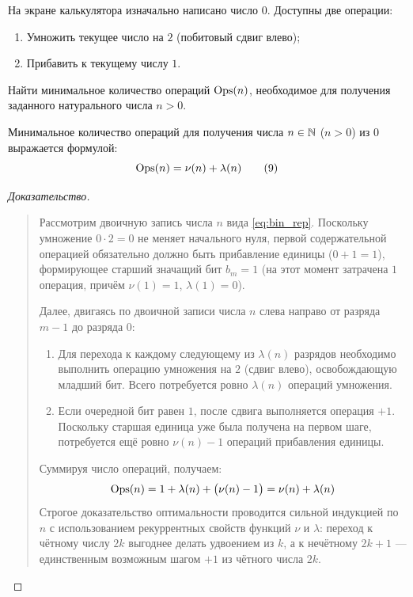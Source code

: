 \begin{problem}
    На экране калькулятора изначально написано число $0$. Доступны две 
    операции:
    \begin{enumerate}
        \item Умножить текущее число на $2$ (побитовый сдвиг влево);
        \item Прибавить к текущему числу $1$.
    \end{enumerate}
    Найти минимальное количество операций $\operatorname{Ops}(n)$, необходимое для 
    получения заданного натурального числа $n > 0$.
\end{problem}

\begin{proposition}
    Минимальное количество операций для получения числа $n \in \mathbb{N}$ ($n > 0$) 
    из $0$ выражается формулой:
    \begin{equation} \label{eq:ops_count}
        \operatorname{Ops}(n) = \nu(n) + \lambda(n) \tag{9}
    \end{equation}
\end{proposition}

\begin{proof}[Доказательство]~\\
    \begin{quote}
        Рассмотрим двоичную запись числа $n$ вида \eqref{eq:bin_rep}. 
        Поскольку умножение $0 \cdot 2 = 0$ не меняет начального нуля, 
        первой содержательной операцией обязательно должно быть прибавление 
        единицы ($0 + 1 = 1$), формирующее старший значащий бит $b_m = 1$ 
        (на этот момент затрачена $1$ операция, причём $\nu(1) = 1$, 
        $\lambda(1) = 0$).

        Далее, двигаясь по двоичной записи числа $n$ слева направо от 
        разряда $m - 1$ до разряда $0$:
        \begin{enumerate}
            \item Для перехода к каждому следующему из $\lambda(n)$ 
            разрядов необходимо выполнить операцию умножения на $2$ (сдвиг 
            влево), освобождающую младший бит. Всего потребуется ровно 
            $\lambda(n)$ операций умножения.
            \item Если очередной бит равен $1$, после сдвига выполняется 
            операция $+1$. Поскольку старшая единица уже была получена на 
            первом шаге, потребуется ещё ровно $\nu(n) - 1$ операций 
            прибавления единицы.
        \end{enumerate}
        Суммируя число операций, получаем:
        \[
            \operatorname{Ops}(n) = 1 + \lambda(n) + \bigl(\nu(n) - 1\bigr) = 
            \nu(n) + \lambda(n)
        \]
        Строгое доказательство оптимальности проводится сильной индукцией 
        по $n$ с использованием рекуррентных свойств функций $\nu$ и 
        $\lambda$: переход к чётному числу $2k$ выгоднее делать удвоением 
        из $k$, а к нечётному $2k + 1$ --- единственным возможным шагом 
        $+1$ из чётного числа $2k$.
    \end{quote}
\end{proof}

